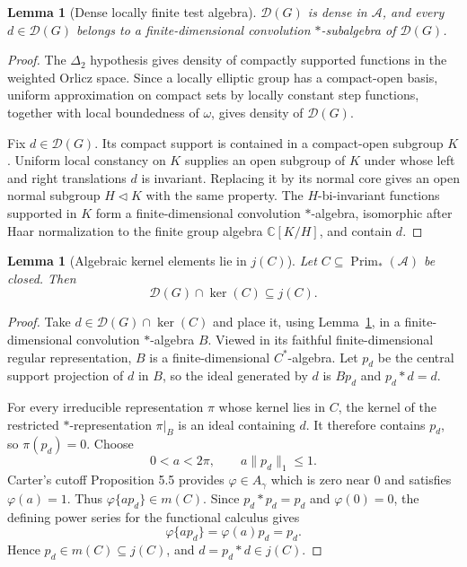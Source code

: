 \documentclass[11pt]{article}
\newtheorem{lemma}[theorem]{Lemma}
\newcommand{\A}{\mathcal A}
\newcommand{\D}{\mathcal D}
\newcommand{\Prim}{\operatorname{Prim}}
\begin{document}
\begin{lemma}[Dense locally finite test algebra]\label{lem:test}
$\D(G)$ is dense in $\A$, and every $d\in\D(G)$ belongs to a
finite-dimensional convolution $*$-subalgebra of $\D(G)$.
\end{lemma}

\begin{proof}
The $\Delta_2$ hypothesis gives density of compactly supported functions in
the weighted Orlicz space.  Since a locally elliptic group has a compact-open
basis, uniform approximation on compact sets by locally constant step
functions, together with local boundedness of $\omega$, gives density of
$\D(G)$.

Fix $d\in\D(G)$.  Its compact support is contained in a compact-open subgroup
$K$.  Uniform local constancy on $K$ supplies an open subgroup of $K$ under
whose left and right translations $d$ is invariant.  Replacing it by its
normal core gives an open normal subgroup $H\triangleleft K$ with the same
property.  The $H$-bi-invariant functions supported in $K$ form a
finite-dimensional convolution $*$-algebra, isomorphic after Haar
normalization to the finite group algebra $\mathbb C[K/H]$, and contain $d$.
\end{proof}

\begin{lemma}[Algebraic kernel elements lie in $j(C)$]\label{lem:algebraic}
Let $C\subseteq\Prim_*(\A)$ be closed.  Then
\[
  \D(G)\cap\ker(C)\subseteq j(C).
\]
\end{lemma}

\begin{proof}
Take $d\in\D(G)\cap\ker(C)$ and place it, using
Lemma~\ref{lem:test}, in a finite-dimensional convolution $*$-algebra $B$.
Viewed in its faithful finite-dimensional regular representation, $B$ is a
finite-dimensional $C^*$-algebra.  Let $p_d$ be the central support projection
of $d$ in $B$, so the ideal generated by $d$ is $Bp_d$ and $p_d*d=d$.

For every irreducible representation $\pi$ whose kernel lies in $C$, the
kernel of the restricted $*$-representation $\pi|_B$ is an ideal containing
$d$.  It therefore contains $p_d$, so $\pi(p_d)=0$.  Choose
\[
 0<a<2\pi,\qquad a\lVert p_d\rVert_1\leq1.
\]
Carter's cutoff Proposition 5.5 provides $\varphi\in A_\gamma$ which is zero
near $0$ and satisfies $\varphi(a)=1$.  Thus $\varphi\{ap_d\}\in m(C)$.
Since $p_d*p_d=p_d$ and $\varphi(0)=0$, the defining power series for the
functional calculus gives
\[
 \varphi\{ap_d\}=\varphi(a)p_d=p_d.
\]
Hence $p_d\in m(C)\subseteq j(C)$, and $d=p_d*d\in j(C)$.
\end{proof}
\end{document}
